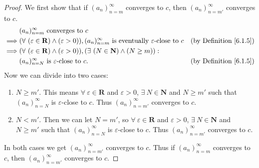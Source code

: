 \begin{proof}
    We first show that if \((a_n)_{n = m}^\infty\) converges to \(c\), then \((a_n)_{n = m'}^\infty\) converges to \(c\).
    \begin{align*}
                 & (a_n)_{n = m}^\infty \text{ converges to } c                                                                                                                                     \\
        \implies & (\forall\ (\varepsilon \in \mathbf{R}) \land (\varepsilon > 0)), (a_n)_{n = m}^\infty \text{ is eventually } \varepsilon\text{-close to } c & \text{(by Definition \ref{6.1.5})} \\
        \implies & (\forall\ (\varepsilon \in \mathbf{R}) \land (\varepsilon > 0)), (\exists\ (N \in \mathbf{N}) \land (N \geq m)) :                                                                \\
                 & (a_n)_{n = N}^\infty \text{ is } \varepsilon\text{-close to } c.                                                                            & \text{(by Definition \ref{6.1.5})}
    \end{align*}
    Now we can divide into two cases:
    \begin{enumerate}
        \item \(N \geq m'\).
              This means \(\forall\ \varepsilon \in \mathbf{R}\) and \(\varepsilon > 0\), \(\exists\ N \in \mathbf{N}\) and \(N \geq m'\) such that \((a_n)_{n = N}^\infty\) is \(\varepsilon\)-close to \(c\).
              Thus \((a_n)_{n = m'}^\infty\) converges to \(c\).
        \item \(N < m'\).
              Then we can let \(N = m'\), so \(\forall\ \varepsilon \in \mathbf{R}\) and \(\varepsilon > 0\), \(\exists\ N \in \mathbf{N}\) and \(N \geq m'\) such that \((a_n)_{n = N}^\infty\) is \(\varepsilon\)-close to \(c\).
              Thus \((a_n)_{n = m'}^\infty\) converges to \(c\).
    \end{enumerate}
    In both cases we get \((a_n)_{n = m'}^\infty\) converges to \(c\).
    Thus if \((a_n)_{n = m}^\infty\) converges to \(c\), then \((a_n)_{n = m'}^\infty\) converges to \(c\).


\end{proof}
